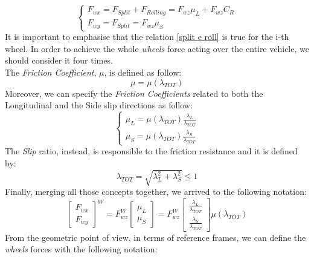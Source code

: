 		\begin{equation} \label{split e roll}
			\begin{cases}
				F_{wx} = F_{Split} + F_{Rolling} = F_{wz} \mu_{L} + F_{wz} C_{R} \\
				F_{wy} = F_{Split} = F_{wz} \mu_{S}
			\end{cases}
		\end{equation}
	It is important to emphasise that the relation \ref{split e roll} is true for the i-th wheel. In order to achieve the whole \textit{wheels} force acting over the entire vehicle, we should consider it four times. \\ The \textit{Friction Coefficient}, $ \mu $, is defined as follow:
		\begin{equation}
			\mu = \mu(\lambda_{TOT})
		\end{equation}
	Moreover, we can specify the \textit{Friction Coefficients} related to both the Longitudinal and the Side slip directions as follow:
		\begin{equation}
			\begin{cases}
				\mu_{L} = \mu(\lambda_{TOT}) \frac{\lambda_{L}}{\lambda_{TOT}}\\
				\mu_{S} = \mu(\lambda_{TOT}) \frac{\lambda_{S}}{\lambda_{TOT}}
			\end{cases}
		\end{equation}
	The \textit{Slip} ratio, instead, is responsible to the friction resistance and it is defined by:
		\begin{equation}
			\lambda_{TOT} = \sqrt{\lambda_{L}^{2} + \lambda_{S}^{2}} \leq 1
		\end{equation}
	Finally, merging all those concepts together, we arrived to the following notation:	
		\begin{equation} \label{Force 1st part}
			\begin{bmatrix}
				F_{wx} \\
				F_{wy}
			\end{bmatrix}^{W} = 
		F_{wz}^{W}
			\begin{bmatrix}
				\mu_{L} \\
				\mu_{S}
			\end{bmatrix} = 
		F_{wz}^{W}
			\begin{bmatrix}
				\frac{\lambda_{L}}{\lambda_{TOT}} \\
				\frac{\lambda_{S}}{\lambda_{TOT}}
			\end{bmatrix}
		\mu(\lambda_{TOT})	
		\end{equation}
	From the geometric point of view, in terms of reference frames, we can define the \textit{wheels} forces with the following notation:
